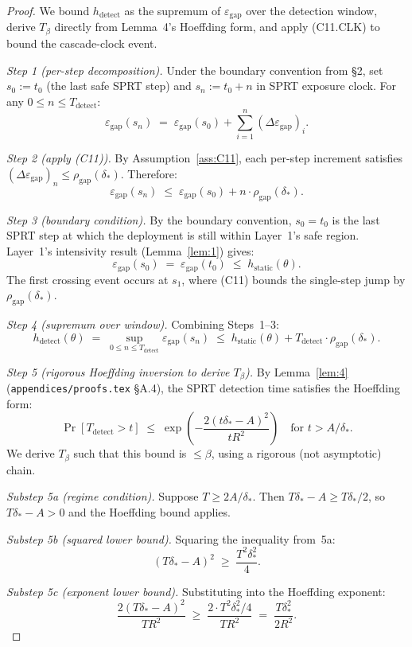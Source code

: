 \documentclass{article}
\newcommand{\deltastar}{\delta_{*}}
\newcommand{\rhogap}{\rho_{\mathrm{gap}}}
\newcommand{\epsgap}{\varepsilon_{\mathrm{gap}}}
\newcommand{\Tbeta}{T_{\beta}}
\begin{document}
\begin{proof}
We bound $h_{\mathrm{detect}}$ as the supremum of $\epsgap$ over
the detection window, derive $\Tbeta$ directly from Lemma~4's
Hoeffding form, and apply (C11.CLK) to bound the cascade-clock
event.

\emph{Step 1 (per-step decomposition).}  Under the boundary
convention from §2, set $s_0 := t_0$ (the last safe SPRT step) and
$s_n := t_0 + n$ in SPRT exposure clock.  For any
$0 \leq n \leq T_{\mathrm{detect}}$:
\[
  \epsgap(s_n) \;=\; \epsgap(s_0) + \sum_{i=1}^{n}
  (\Delta \epsgap)_i.
\]

\emph{Step 2 (apply (C11)).}  By Assumption~\ref{ass:C11}, each
per-step increment satisfies $(\Delta \epsgap)_n \leq
\rhogap(\deltastar)$.  Therefore:
\[
  \epsgap(s_n) \;\leq\; \epsgap(s_0) + n \cdot
  \rhogap(\deltastar).
\]

\emph{Step 3 (boundary condition).}  By the boundary convention,
$s_0 = t_0$ is the last SPRT step at which the deployment is still
within Layer~1's safe region.  Layer~1's intensivity result
(Lemma~\ref{lem:1}) gives:
\[
  \epsgap(s_0) \;=\; \epsgap(t_0) \;\leq\;
  h_{\mathrm{static}}(\theta).
\]
The first crossing event occurs at $s_1$, where (C11) bounds the
single-step jump by $\rhogap(\deltastar)$.

\emph{Step 4 (supremum over window).}  Combining Steps~1--3:
\[
  h_{\mathrm{detect}}(\theta) \;=\;
  \sup_{0 \leq n \leq T_{\mathrm{detect}}} \epsgap(s_n)
  \;\leq\; h_{\mathrm{static}}(\theta) +
  T_{\mathrm{detect}} \cdot \rhogap(\deltastar).
\]

\emph{Step 5 (rigorous Hoeffding inversion to derive $\Tbeta$).}
By Lemma~\ref{lem:4} (\texttt{appendices/proofs.tex} §A.4), the
SPRT detection time satisfies the Hoeffding form:
\[
  \Pr[T_{\mathrm{detect}} > t] \;\leq\;
  \exp\!\left(-\frac{2(t \deltastar - A)^2}{t R^2}\right)
  \quad \text{for } t > A/\deltastar.
\]
We derive $\Tbeta$ such that this bound is $\leq \beta$, using a
rigorous (not asymptotic) chain.

\emph{Substep 5a (regime condition).}  Suppose
$T \geq 2A/\deltastar$.  Then $T\deltastar - A \geq T\deltastar/2$,
so $T\deltastar - A > 0$ and the Hoeffding bound applies.

\emph{Substep 5b (squared lower bound).}  Squaring the inequality
from~5a:
\[
  (T\deltastar - A)^2 \;\geq\; \frac{T^2 \deltastar^2}{4}.
\]

\emph{Substep 5c (exponent lower bound).}  Substituting into the
Hoeffding exponent:
\[
  \frac{2(T\deltastar - A)^2}{T R^2} \;\geq\;
  \frac{2 \cdot T^2 \deltastar^2 / 4}{T R^2} \;=\;
  \frac{T \deltastar^2}{2 R^2}.
\]


\end{proof}
\end{document}
